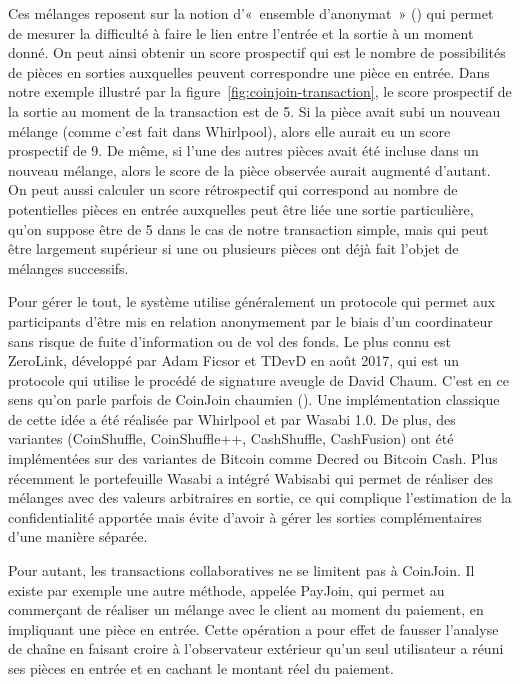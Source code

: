 Ces mélanges reposent sur la notion d'«~ensemble d'anonymat~» () qui permet de mesurer la difficulté à faire le lien entre l'entrée et la sortie à un moment donné. On peut ainsi obtenir un score prospectif qui est le nombre de possibilités de pièces en sorties auxquelles peuvent correspondre une pièce en entrée. Dans notre exemple illustré par la figure~\ref{fig:coinjoin-transaction}, le score prospectif de la sortie au moment de la transaction est de 5. Si la pièce avait subi un nouveau mélange (comme c'est fait dans Whirlpool), alors elle aurait eu un score prospectif de 9. De même, si l'une des autres pièces avait été incluse dans un nouveau mélange, alors le score de la pièce observée aurait augmenté d'autant. On peut aussi calculer un score rétrospectif qui correspond au nombre de potentielles pièces en entrée auxquelles peut être liée une sortie particulière, qu'on suppose être de 5 dans le cas de notre transaction simple, mais qui peut être largement supérieur si une ou plusieurs pièces ont déjà fait l'objet de mélanges successifs.

Pour gérer le tout, le système utilise généralement un protocole qui permet aux participants d'être mis en relation anonymement par le biais d'un coordinateur sans risque de fuite d'information ou de vol des fonds. Le plus connu est ZeroLink, développé par Adam Ficsor et TDevD en août 2017, qui est un protocole qui utilise le procédé de signature aveugle de David Chaum. C'est en ce sens qu'on parle parfois de CoinJoin chaumien (). Une implémentation classique de cette idée a été réalisée par Whirlpool et par Wasabi 1.0. De plus, des variantes (CoinShuffle, CoinShuffle++, CashShuffle, CashFusion) ont été implémentées sur des variantes de Bitcoin comme Decred ou Bitcoin Cash. Plus récemment le portefeuille Wasabi a intégré Wabisabi qui permet de réaliser des mélanges avec des valeurs arbitraires en sortie, ce qui complique l'estimation de la confidentialité apportée mais évite d'avoir à gérer les sorties complémentaires d'une manière séparée.

Pour autant, les transactions collaboratives ne se limitent pas à CoinJoin. Il existe par exemple une autre méthode, appelée PayJoin, qui permet au commerçant de réaliser un mélange avec le client au moment du paiement, en impliquant une pièce en entrée. Cette opération a pour effet de fausser l'analyse de chaîne en faisant croire à l'observateur extérieur qu'un seul utilisateur a réuni ses pièces en entrée et en cachant le montant réel du paiement.

